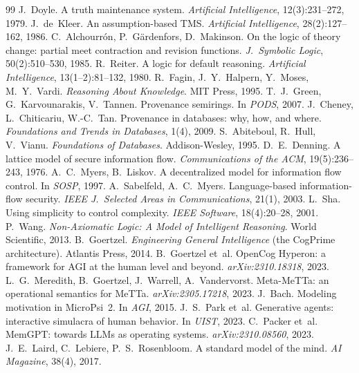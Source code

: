 \documentclass[11pt]{article}
\theoremstyle{plain}
\theoremstyle{definition}
\begin{document}
\begin{thebibliography}{99}
\small
{} J.~Doyle. A truth maintenance system. \emph{Artificial
Intelligence}, 12(3):231--272, 1979.
 J.~de~Kleer. An assumption-based TMS. \emph{Artificial
Intelligence}, 28(2):127--162, 1986.
 C.~Alchourr\'on, P.~G\"ardenfors, D.~Makinson. On the logic of
theory change: partial meet contraction and revision functions. \emph{J.\ Symbolic
Logic}, 50(2):510--530, 1985.
 R.~Reiter. A logic for default reasoning. \emph{Artificial
Intelligence}, 13(1--2):81--132, 1980.
 R.~Fagin, J.~Y.~Halpern, Y.~Moses, M.~Y.~Vardi. \emph{Reasoning
About Knowledge}. MIT Press, 1995.
 T.~J.~Green, G.~Karvounarakis, V.~Tannen. Provenance
semirings. In \emph{PODS}, 2007.
 J.~Cheney, L.~Chiticariu, W.-C.~Tan. Provenance in databases:
why, how, and where. \emph{Foundations and Trends in Databases}, 1(4), 2009.
 S.~Abiteboul, R.~Hull, V.~Vianu. \emph{Foundations of
Databases}. Addison-Wesley, 1995.
 D.~E.~Denning. A lattice model of secure information flow.
\emph{Communications of the ACM}, 19(5):236--243, 1976.
 A.~C.~Myers, B.~Liskov. A decentralized model for information
flow control. In \emph{SOSP}, 1997.
 A.~Sabelfeld, A.~C.~Myers. Language-based information-flow
security. \emph{IEEE J.\ Selected Areas in Communications}, 21(1), 2003.
 L.~Sha. Using simplicity to control complexity. \emph{IEEE
Software}, 18(4):20--28, 2001.
 P.~Wang. \emph{Non-Axiomatic Logic: A Model of Intelligent
Reasoning}. World Scientific, 2013.
 B.~Goertzel. \emph{Engineering General Intelligence}
(the CogPrime architecture). Atlantis Press, 2014.
 B.~Goertzel et~al. OpenCog Hyperon: a framework for AGI at
the human level and beyond. \emph{arXiv:2310.18318}, 2023.
 L.~G.~Meredith, B.~Goertzel, J.~Warrell, A.~Vandervorst.
Meta-MeTTa: an operational semantics for MeTTa. \emph{arXiv:2305.17218}, 2023.
 J.~Bach. Modeling motivation in MicroPsi~2. In \emph{AGI}, 2015.
 J.~S.~Park et~al. Generative agents: interactive simulacra of
human behavior. In \emph{UIST}, 2023.
 C.~Packer et~al. MemGPT: towards LLMs as operating systems.
\emph{arXiv:2310.08560}, 2023.
 J.~E.~Laird, C.~Lebiere, P.~S.~Rosenbloom. A standard model of
the mind. \emph{AI Magazine}, 38(4), 2017.
\end{thebibliography}
\end{document}
